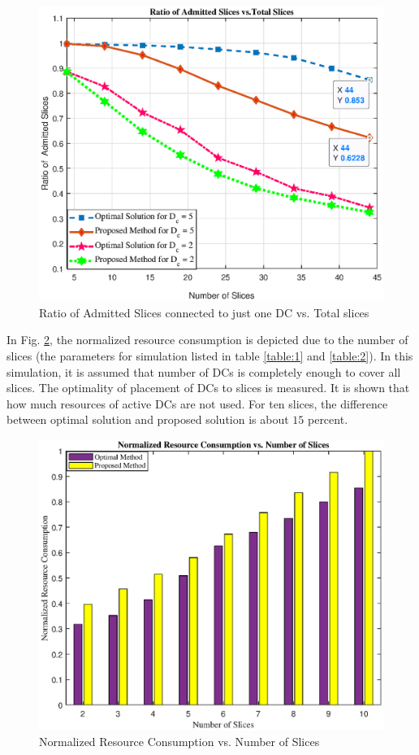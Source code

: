 \documentclass[conference]{IEEEtran}
\begin{document}
\begin{figure}[H]
  \centering
    \includegraphics[width=\linewidth]{f11}
  \caption{Ratio of Admitted Slices connected to just one DC vs. Total slices}
  \label{fig:f1}
\end{figure} 
In Fig. \ref{fig:f2}, the normalized resource consumption is depicted due to the number of slices (the parameters for simulation listed in table \ref{table:1} and \ref{table:2}). In this simulation, it is assumed that number of DCs is completely enough to cover all slices. The optimality of placement of DCs to slices is measured. It is shown that how much resources of active DCs are not used. For ten slices, the difference between optimal solution and proposed solution is about $15$ percent. 
\begin{figure}[H]
  \centering
    \includegraphics[width=\linewidth]{fig2_last}
  \caption{Normalized Resource Consumption vs. Number of Slices}
  \label{fig:f2}
\end{figure} 


\end{document}

